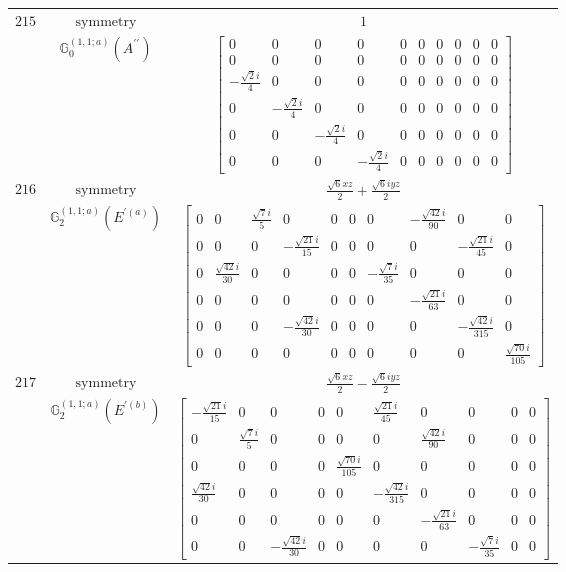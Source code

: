 \documentclass[fleqn,8pt,landscape]{jsarticle}
\begin{document}
\begin{longtable}{ccc}
$ 215 $ & $ \text{symmetry} $ & $ 1 $ \\
$  $ & $ \mathbb{G}_{0}^{(1,1;a)}(A^{\prime\prime}) $ & $ \begin{bmatrix} 0 & 0 & 0 & 0 & 0 & 0 & 0 & 0 & 0 & 0 \\ 0 & 0 & 0 & 0 & 0 & 0 & 0 & 0 & 0 & 0 \\ - \frac{\sqrt{2} i}{4} & 0 & 0 & 0 & 0 & 0 & 0 & 0 & 0 & 0 \\ 0 & - \frac{\sqrt{2} i}{4} & 0 & 0 & 0 & 0 & 0 & 0 & 0 & 0 \\ 0 & 0 & - \frac{\sqrt{2} i}{4} & 0 & 0 & 0 & 0 & 0 & 0 & 0 \\ 0 & 0 & 0 & - \frac{\sqrt{2} i}{4} & 0 & 0 & 0 & 0 & 0 & 0 \end{bmatrix} $ \\ \hline
$ 216 $ & $ \text{symmetry} $ & $ \frac{\sqrt{6} x z}{2} + \frac{\sqrt{6} i y z}{2} $ \\
$  $ & $ \mathbb{G}_{2}^{(1,1;a)}(E^{\prime(a)}) $ & $ \begin{bmatrix} 0 & 0 & \frac{\sqrt{7} i}{5} & 0 & 0 & 0 & 0 & - \frac{\sqrt{42} i}{90} & 0 & 0 \\ 0 & 0 & 0 & - \frac{\sqrt{21} i}{15} & 0 & 0 & 0 & 0 & - \frac{\sqrt{21} i}{45} & 0 \\ 0 & \frac{\sqrt{42} i}{30} & 0 & 0 & 0 & 0 & - \frac{\sqrt{7} i}{35} & 0 & 0 & 0 \\ 0 & 0 & 0 & 0 & 0 & 0 & 0 & - \frac{\sqrt{21} i}{63} & 0 & 0 \\ 0 & 0 & 0 & - \frac{\sqrt{42} i}{30} & 0 & 0 & 0 & 0 & - \frac{\sqrt{42} i}{315} & 0 \\ 0 & 0 & 0 & 0 & 0 & 0 & 0 & 0 & 0 & \frac{\sqrt{70} i}{105} \end{bmatrix} $ \\ \hline
$ 217 $ & $ \text{symmetry} $ & $ \frac{\sqrt{6} x z}{2} - \frac{\sqrt{6} i y z}{2} $ \\
$  $ & $ \mathbb{G}_{2}^{(1,1;a)}(E^{\prime(b)}) $ & $ \begin{bmatrix} - \frac{\sqrt{21} i}{15} & 0 & 0 & 0 & 0 & \frac{\sqrt{21} i}{45} & 0 & 0 & 0 & 0 \\ 0 & \frac{\sqrt{7} i}{5} & 0 & 0 & 0 & 0 & \frac{\sqrt{42} i}{90} & 0 & 0 & 0 \\ 0 & 0 & 0 & 0 & \frac{\sqrt{70} i}{105} & 0 & 0 & 0 & 0 & 0 \\ \frac{\sqrt{42} i}{30} & 0 & 0 & 0 & 0 & - \frac{\sqrt{42} i}{315} & 0 & 0 & 0 & 0 \\ 0 & 0 & 0 & 0 & 0 & 0 & - \frac{\sqrt{21} i}{63} & 0 & 0 & 0 \\ 0 & 0 & - \frac{\sqrt{42} i}{30} & 0 & 0 & 0 & 0 & - \frac{\sqrt{7} i}{35} & 0 & 0 \end{bmatrix} $ \\ \hline

\end{longtable}
\end{document}

